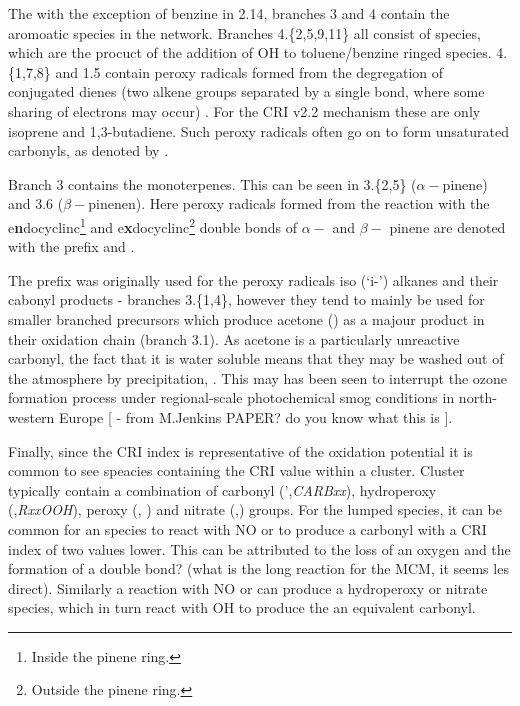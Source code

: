 The with the exception of benzine in 2.14, branches 3 and 4 contain the aromoatic species in the network.  Branches 4.\{2,5,9,11\} all consist of \emph{} species, which are the procuct of the addition of OH to toluene/benzine ringed species. 4.\{1,7,8\} and 1.5 contain peroxy radicals formed from the degregation of conjugated dienes (two alkene groups separated by a single bond, where some sharing of electrons may occur) \emph{}. For the CRI v2.2 mechanism these are only isoprene and 1,3-butadiene. Such peroxy radicals often go on to form unsaturated carbonyls, as denoted by \emph{}.

Branch 3 contains the monoterpenes. This can be seen in 3.\{2,5\} ($\alpha-$pinene) and 3.6 ($\beta-$pinenen). Here peroxy radicals formed from the reaction with the e\textbf{n}docyclinc\footnote{Inside the pinene ring.} and e\textbf{x}docyclinc\footnote{Outside the pinene ring.} double bonds of $\alpha-$ and $\beta-$ pinene are denoted with the prefix \emph{} and \emph{}.

The \emph{} prefix was originally used for the peroxy radicals iso (`i-') alkanes and their cabonyl products - branches 3.\{1,4\}, however they tend to mainly be used for smaller branched precursors which produce acetone () as a majour product in their oxidation chain (branch 3.1). As acetone is a particularly unreactive carbonyl, the fact that it is water soluble means that they may be washed out of the atmosphere by precipitation, \citep{acetonerain}. This may has been seen to interrupt the ozone formation process under regional-scale photochemical smog conditions in north-western Europe [ - from M.Jenkins PAPER? do you know what this is ].


Finally, since the CRI index is representative of the oxidation potential it is common to see speacies containing the CRI value within a cluster. Cluster typically contain a combination of carbonyl (',\emph{CARBxx}), hydroperoxy (,\emph{RxxOOH}), peroxy (, \emph{}) and nitrate (,\emph{}) groups. For the lumped species, it can be common for an  species to react with NO or  to produce a carbonyl with a CRI index of two values lower. This can be attributed to the loss of an oxygen and the formation of a double bond? (what is the long reaction for the MCM, it seems les direct). Similarly a reaction with NO or  can produce a hydroperoxy or nitrate species, which in turn react with OH to produce the an equivalent carbonyl.


